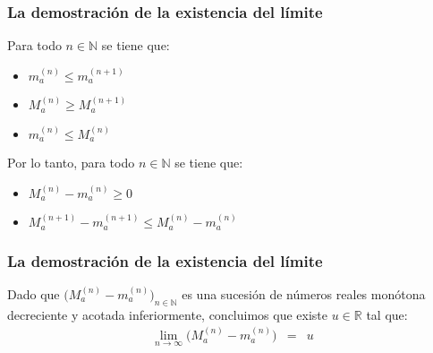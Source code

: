 \begin{frame}
\frametitle{La demostración de la existencia del límite}

{\small

Para todo $n \in \mathbb{N}$ se tiene que:
\begin{itemize}
\item $m_a^{(n)} \leq m_a^{(n+1)}$
\item $M_a^{(n)} \geq M_a^{(n+1)}$
\item $m_a^{(n)} \leq M_a^{(n)}$
\end{itemize}


Por lo tanto, para todo $n \in \mathbb{N}$ se tiene que:
\begin{itemize}
\item $M_a^{(n)} - m_a^{(n)} \geq 0$
\item $M_a^{(n+1)} - m_a^{(n+1)} \leq M_a^{(n)} - m_a^{(n)}$
\end{itemize}


}

\end{frame}


\begin{frame}
\frametitle{La demostración de la existencia del límite}

{\footnotesize

Dado que $\big(M_a^{(n)} - m_a^{(n)}\big)_{n \in \mathbb{N}}$ es una sucesión de números reales monótona decreciente y acotada inferiormente, concluimos que existe $u \in \mathbb{R}$ tal que:
\begin{eqnarray*}
\lim_{n \to \infty} \big(M_a^{(n)} - m_a^{(n)}\big) & = & u
\end{eqnarray*}




\begin{itemize}
\end{itemize}

}

\end{frame}


